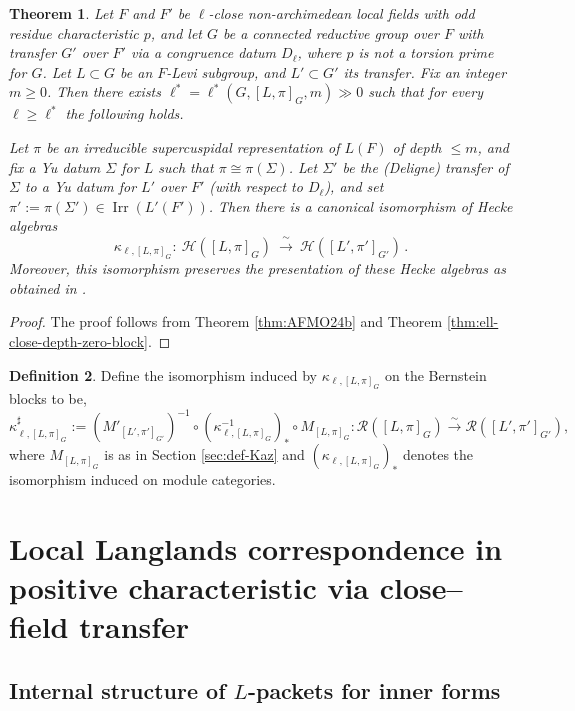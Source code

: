 \documentclass[american]{article}
\numberwithin{equation}{section}
\numberwithin{figure}{section}
\theoremstyle{plain}
\newtheorem{theorem}{Theorem}[section]
\theoremstyle{definition}
\newtheorem{definition}[theorem]{Definition}
\theoremstyle{remark}
\DeclareMathOperator{\Irr}{Irr}
\begin{document}
\begin{theorem}\label{thm:ell-close-arbitrary-blocks}
Let $F$ and $F'$ be $\ell$-close non-archimedean local fields with odd residue
characteristic $p$, and let $G$ be a connected reductive group over $F$ with
transfer $G'$ over $F'$ via a congruence datum $D_\ell$, where $p$ is not a torsion
prime for $G$. Let $L\subset G$ be an $F$-Levi subgroup, and $L'\subset G'$ its transfer.
Fix an integer $m\ge 0$. Then there exists $\ell^\ast=\ell^\ast(G,[L,\pi]_G,m)\gg 0$
such that for every $\ell\ge \ell^\ast$ the following holds.

Let $\pi$ be an irreducible supercuspidal representation of $L(F)$ of depth $\le m$,
and fix a Yu datum $\Sigma$ for $L$ such that $\pi \cong \pi(\Sigma)$.
Let $\Sigma'$ be the (Deligne) transfer of $\Sigma$ to a Yu datum for $L'$ over $F'$
(with respect to $D_\ell$), and set $\pi' := \pi(\Sigma')\in \Irr(L'(F'))$.
Then there is a canonical isomorphism of Hecke algebras
\[
\kappa_{\ell,[L,\pi]_G}:\ \mathcal{H}([L,\pi]_G)\ \xrightarrow{\ \sim\ }\ \mathcal{H}([L',\pi']_{G'})\, .
\]
Moreover, this isomorphism preserves the presentation of these Hecke algebras as
obtained in \cite[\S 5.3.6]{AFMO24b}.

\end{theorem}
\begin{proof}
    The proof follows from Theorem \ref{thm:AFMO24b} and Theorem \ref{thm:ell-close-depth-zero-block}. 
\end{proof}
\begin{definition}\label{def:kappa-sharp}
Define the isomorphism induced by \(\kappa_{\ell,[L,\pi]_G}\) on the Bernstein blocks to be,
\[
\kappa_{\ell,[L,\pi]_G}^{\sharp}
:= (M'_{[L',\pi']_{G'}})^{-1}\circ
(\kappa_{\ell,[L,\pi]_G}^{-1})_{*}\circ
M_{[L,\pi]_G}:
\mathcal R([L,\pi]_G)\xrightarrow{\sim}\mathcal R([L',\pi']_{G'}) ,
\]
where \(M_{[L,\pi]_G}\) is as in Section \ref{sec:def-Kaz} and \((\kappa_{\ell,[L,\pi]_G})_{*}\) denotes the isomorphism induced on module categories. 
\end{definition}
\section{Local Langlands correspondence in positive characteristic via close--field transfer}

\subsection{Internal structure of $L$-packets for inner forms}\label{sec:l-packet-internal-struct}
\end{document}
